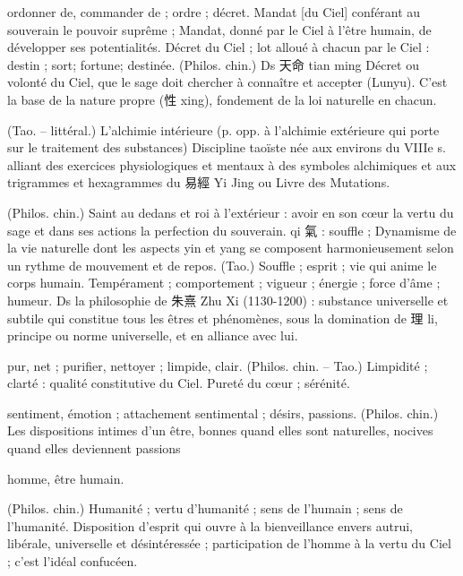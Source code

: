    
\begin{Def}[ming 命 ]
     ordonner de, commander de ; ordre ; décret.     Mandat [du Ciel] conférant au souverain le pouvoir suprême ;	Mandat, donné par le Ciel à l’être humain, de développer ses potentialités.     Décret du Ciel ; lot alloué à chacun par le Ciel : destin ; sort; fortune; destinée. (Philos. chin.) Ds 天命 tian ming Décret ou volonté du Ciel, que le sage doit chercher à connaître et accepter (Lunyu). C’est la base de la nature propre (性 xing), fondement de la loi naturelle en chacun. 
\end{Def}
\begin{Def}[neidan 内丹 ]
    (Tao.	–	littéral.) 	    L’alchimie intérieure (p. opp. à l’alchimie extérieure qui porte sur le traitement des substances) Discipline taoïste née aux environs du VIIIe s. alliant des exercices physiologiques et mentaux à des symboles alchimiques et aux trigrammes et hexagrammes du 易經 Yi Jing ou Livre des Mutations. 
\end{Def}
\begin{Def}
    (Philos. chin.) Saint au dedans et roi à l’extérieur : avoir en son cœur la vertu du sage et dans ses actions la perfection du souverain.	qi 氣 : souffle ; Dynamisme de la vie naturelle dont les	aspects yin et yang se composent harmonieusement selon un rythme de mouvement et de repos.     (Tao.) Souffle ; esprit ; vie qui anime le corps humain.     Tempérament ; comportement ; vigueur ; énergie ; force d’âme ; humeur. Ds la philosophie de 朱熹 Zhu Xi (1130-1200) : substance universelle et subtile qui constitue tous les êtres et phénomènes, sous la domination de 理 li, principe ou norme universelle, et en alliance avec lui. 
\end{Def}
\begin{Def}[qing 清 ]
    pur, net ; purifier, nettoyer ; limpide, clair. (Philos. chin. – Tao.) Limpidité ; clarté : qualité constitutive du Ciel. Pureté du cœur ; sérénité.  
\end{Def}
\begin{Def}[qing 情]
    sentiment, émotion ; attachement sentimental ; désirs, passions. (Philos. chin.) Les dispositions intimes d’un être, bonnes quand elles sont naturelles, nocives quand elles deviennent passions 
\end{Def}
\begin{Def}[ren 人]
    homme, être humain.
\end{Def}

\begin{Def}[ren 仁]
    (Philos. chin.) Humanité ; vertu d’humanité ; sens de l’humain ; sens de l’humanité. Disposition d’esprit qui ouvre à la bienveillance envers autrui, libérale, universelle et désintéressée ; participation de l’homme à la vertu du Ciel ; c’est l’idéal confucéen.	
\end{Def}
 
